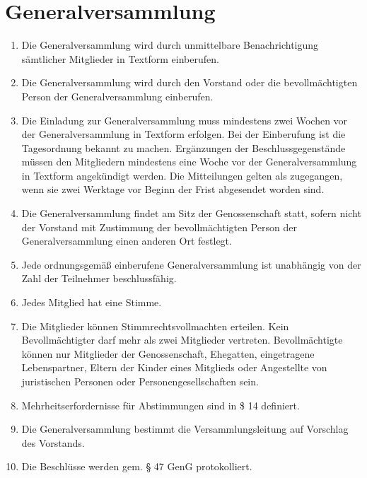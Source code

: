\documentclass[a4paper, 12pt]{scrartcl}
\begin{document}
\section{Generalversammlung}
\begin{enumerate}
  \item Die Generalversammlung wird durch unmittelbare Benachrichtigung sämtlicher Mitglieder in Textform einberufen.
  \item Die Generalversammlung wird durch den Vorstand oder die bevollmächtigten Person der Generalversammlung einberufen.
  \item Die Einladung zur Generalversammlung muss mindestens zwei Wochen vor der Generalversammlung in Textform erfolgen. Bei der Einberufung ist die Tagesordnung bekannt zu machen. Ergänzungen der Beschlussgegenstände müssen den Mitgliedern mindestens eine Woche vor der Generalversammlung in Textform angekündigt werden. Die Mitteilungen gelten als zugegangen, wenn sie zwei Werktage vor Beginn der Frist abgesendet worden sind.
  \item Die Generalversammlung findet am Sitz der Genossenschaft statt, sofern nicht der Vorstand mit Zustimmung der bevollmächtigten Person der Generalversammlung einen anderen Ort festlegt.
  \item Jede ordnungsgemäß einberufene Generalversammlung ist unabhängig von der Zahl der Teilnehmer beschlussfähig.
  \item Jedes Mitglied hat eine Stimme.
  \item Die Mitglieder können Stimmrechtsvollmachten erteilen. Kein Bevollmächtigter darf mehr als zwei Mitglieder vertreten. Bevollmächtigte können nur Mitglieder der Genossenschaft, Ehegatten, eingetragene Lebenspartner, Eltern der Kinder eines Mitglieds oder Angestellte von juristischen Personen oder Personengesellschaften sein.
  \item Mehrheitserfordernisse für Abstimmungen sind in \$ 14 definiert.
  \item Die Generalversammlung bestimmt die Versammlungsleitung auf Vorschlag des Vorstands.
  \item Die Beschlüsse werden gem. § 47 GenG protokolliert.
\end{enumerate}
\end{document}
